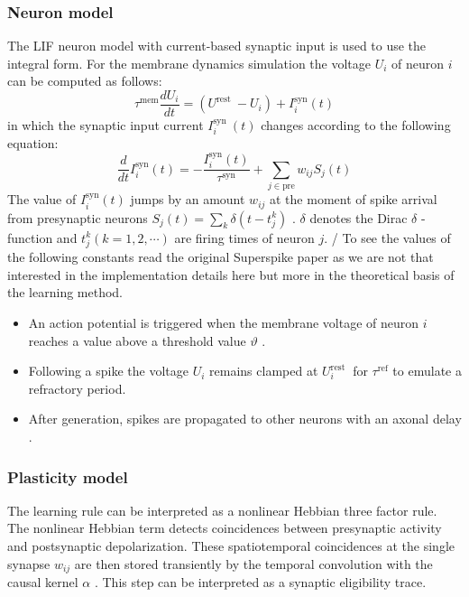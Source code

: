 \documentclass[12pt]{report}
\begin{document}
\subsubsection{Neuron model}
The LIF neuron model with current-based synaptic input is used to use the integral form. For the membrane dynamics simulation the voltage $U_{i}$ of neuron $i$ can be computed as follows:
\begin{equation}
\label{eqn:lifvoltage}
\tau^{\mathrm{mem}} \frac{d U_{i}}{d t}=\left(U^{\text {rest }}-U_{i}\right)+I_{i}^{\mathrm{syn}}(t)
\end{equation}
in which the synaptic input current $I_{i}^{\text {syn }}(t)$ changes according to the following equation:
\begin{equation}
\frac{d}{d t} I_{i}^{\mathrm{syn}}(t)=-\frac{I_{i}^{\mathrm{syn}}(t)}{\tau^{\mathrm{syn}}}+\sum_{j \in \mathrm{pre}} w_{i j} S_{j}(t)
\end{equation}
The value of $I_{i}^{\mathrm{syn}}(t)$ jumps by an amount $w_{i j}$ at the moment of spike arrival from presynaptic neurons $S_{j}(t)=\sum_{k} \delta\left(t-t_{j}^{k}\right)$ . $\delta$ denotes the Dirac $\delta$ -function and $t_{j}^{k}(k=1,2, \cdots)$ are firing times of neuron $j .$ / To see the values of the following constants read the original Superspike paper as we are not that interested in the implementation details here but more in the theoretical basis of the learning method.
\begin{itemize}
    \item An action potential is triggered when the membrane voltage of neuron $i$ reaches a value above a threshold value $\vartheta$ . 
    \item Following a spike the voltage $U_{i}$ remains clamped at $U_{i}^{\text {rest }}$ for $\tau^{\mathrm{ref}}$ to emulate a refractory period. 
    \item After generation, spikes are propagated to other neurons with an axonal delay .
\end{itemize}

\subsubsection{Plasticity model}
The learning rule can be interpreted as a nonlinear Hebbian three factor rule. The nonlinear Hebbian term detects coincidences between presynaptic activity and postsynaptic depolarization. These spatiotemporal coincidences at the single synapse $w_{i j}$ are then stored transiently by the temporal convolution with the causal kernel $\alpha$ . This step can be interpreted as a synaptic eligibility trace. 
\end{document}

